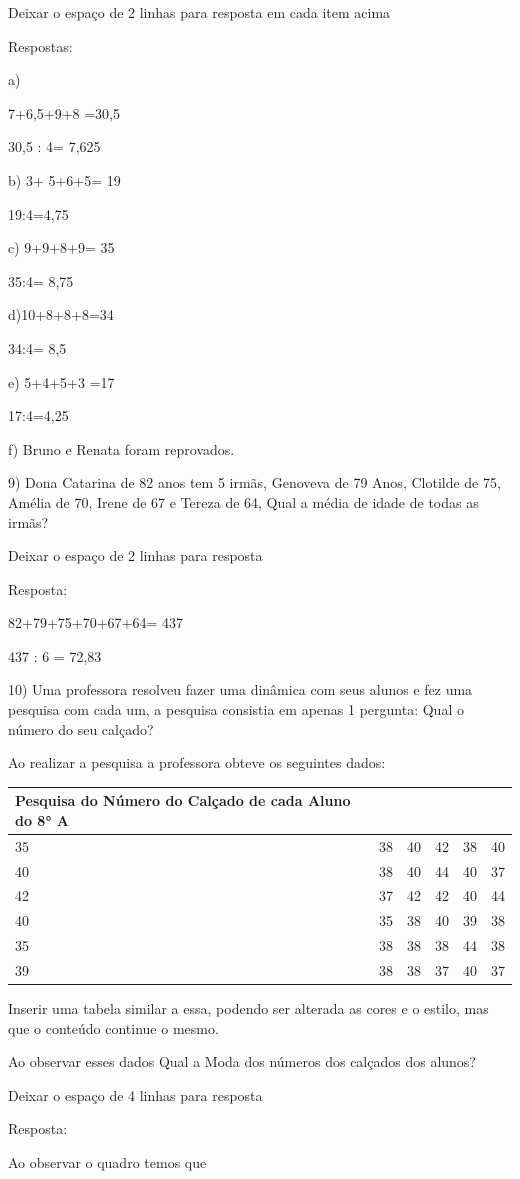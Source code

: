 {Deixar o espaço de 2 linhas para resposta em cada item acima

Respostas:

a)

7+6,5+9+8 =30,5

30,5 : 4= 7,625

b) 3+ 5+6+5= 19

19:4=4,75

c) 9+9+8+9= 35

35:4= 8,75

d)10+8+8+8=34

34:4= 8,5

e) 5+4+5+3 =17

17:4=4,25

f) Bruno e Renata foram reprovados.

9) Dona Catarina de 82 anos tem 5 irmãs, Genoveva de 79 Anos, Clotilde
de 75, Amélia de 70, Irene de 67 e Tereza de 64, Qual a média de idade
de todas as irmãs?

Deixar o espaço de 2 linhas para resposta

Resposta:

82+79+75+70+67+64= 437

437 : 6 = 72,83

10) Uma professora resolveu fazer uma dinâmica com seus alunos e fez uma
pesquisa com cada um, a pesquisa consistia em apenas 1 pergunta: Qual o
número do seu calçado?

Ao realizar a pesquisa a professora obteve os seguintes dados:

\begin{longtable}[]{@{}llllll@{}}
\toprule
Pesquisa do Número do Calçado de cada Aluno do 8° A & & & &
&\tabularnewline
\midrule
\endhead
35 & 38 & 40 & 42 & 38 & 40\tabularnewline
40 & 38 & 40 & 44 & 40 & 37\tabularnewline
42 & 37 & 42 & 42 & 40 & 44\tabularnewline
40 & 35 & 38 & 40 & 39 & 38\tabularnewline
35 & 38 & 38 & 38 & 44 & 38\tabularnewline
39 & 38 & 38 & 37 & 40 & 37\tabularnewline
\bottomrule
\end{longtable}

Inserir uma tabela similar a essa, podendo ser alterada as cores e o
estilo, mas que o conteúdo continue o mesmo.

Ao observar esses dados Qual a Moda dos números dos calçados dos alunos?

Deixar o espaço de 4 linhas para resposta

Resposta:

Ao observar o quadro temos que

}
